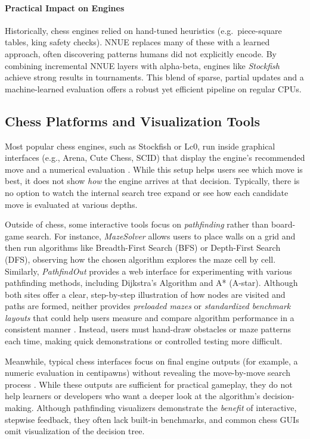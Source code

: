 \documentclass[12pt,a4paper]{article}
\begin{document}
\paragraph{Practical Impact on Engines}
Historically, chess engines relied on hand-tuned heuristics (e.g.\ piece-square tables, king safety checks). NNUE replaces many of these with a learned approach, often discovering patterns humans did not explicitly encode. By combining incremental NNUE layers with alpha-beta, engines like \emph{Stockfish} achieve strong results in tournaments. This blend of sparse, partial updates and a machine-learned evaluation offers a robust yet efficient pipeline on regular CPUs.


\subsection{Chess Platforms and Visualization Tools}
\label{sec:chess_and_visualization}

Most popular chess engines, such as Stockfish or Lc0, run inside graphical interfaces (e.g., Arena, Cute Chess, SCID) that display the engine’s recommended move and a numerical evaluation \cite{stockfishdocs,lichessEngineIntegration,arenaDocs,cuTechessDocs,scidDocs}. While this setup helps users see which move is best, it does not show \emph{how} the engine arrives at that decision. Typically, there is no option to watch the internal search tree expand or see how each candidate move is evaluated at various depths.

Outside of chess, some interactive tools focus on \emph{pathfinding} rather than board-game search. For instance, \emph{MazeSolver} \cite{mazeSolverSite} allows users to place walls on a grid and then run algorithms like Breadth-First Search (BFS) or Depth-First Search (DFS), observing how the chosen algorithm explores the maze cell by cell. Similarly, \emph{PathfindOut} \cite{pathfindoutSite} provides a web interface for experimenting with various pathfinding methods, including Dijkstra’s Algorithm and A* (A-star). Although both sites offer a clear, step-by-step illustration of how nodes are visited and paths are formed, neither provides \emph{preloaded mazes} or \emph{standardized benchmark layouts} that could help users measure and compare algorithm performance in a consistent manner \cite{SomePathfindingDiscussion}. Instead, users must hand-draw obstacles or maze patterns each time, making quick demonstrations or controlled testing more difficult.

Meanwhile, typical chess interfaces focus on final engine outputs (for example, a numeric evaluation in centipawns) without revealing the move-by-move search process \cite{AlphaBetaTutorial}. While these outputs are sufficient for practical gameplay, they do not help learners or developers who want a deeper look at the algorithm’s decision-making. Although pathfinding visualizers demonstrate the \emph{benefit} of interactive, stepwise feedback, they often lack built-in benchmarks, and common chess GUIs omit visualization of the decision tree.
\end{document}
